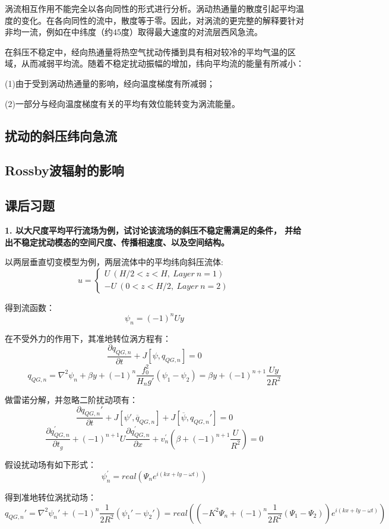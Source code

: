 \documentclass{article}
\begin{document}
涡流相互作用不能完全以各向同性的形式进行分析。涡动热通量的散度引起平均温度的变化。在各向同性的流中，散度等于零。因此，对涡流的更完整的解释要针对非均一流，例如在中纬度（约$45$度）取得最大速度的对流层西风急流。

在斜压不稳定中，经向热通量将热空气扰动传播到具有相对较冷的平均气温的区域，从而减弱平均流。随着不稳定扰动振幅的增加，纬向平均流的能量有所减小：

(1)由于受到涡动热通量的影响，经向温度梯度有所减弱；

(2)一部分与经向温度梯度有关的平均有效位能转变为涡流能量。


\subsection{扰动的斜压纬向急流}
\subsection{Rossby波辐射的影响}
\subsection{课后习题}
\textbf{1. 以大尺度平均平行流场为例，试讨论该流场的斜压不稳定需满足的条件，
并给出不稳定扰动模态的空间尺度、传播相速度、以及空间结构。}

以两层垂直切变模型为例，两层流体中的平均纬向斜压流体:
$$u=\begin{cases}
    U \ (H/2<z<H,\ Layer \ n=1) \\
    -U \ (0 < z < H/2, \ Layer \ n=2)
\end{cases}$$

得到流函数：
$$\psi_n = (-1)^{n}Uy$$

在不受外力的作用下，其准地转位涡方程有：
$$\frac{\partial q_{QG,n}}{\partial t} + J[\psi, q_{QG,n}] = 0$$
$$q_{QG,n} 
=\nabla^2\psi_n + \beta y + (-1)^{n}\frac{f_0^2}{H_ng'}(\psi_1 - \psi_2)
=\beta y + (-1)^{n+1}\frac{Uy}{2R^2}$$

做雷诺分解，并忽略二阶扰动项有：
$$\frac{\partial q_{QG,n}'}{\partial t} 
+ J[\psi', \overline{q}_{QG,n}]
+ J[\overline{\psi}, q_{QG,n}'] = 0$$
$$$$
$$\frac{\partial q^{\prime}_{QG,n}}{\partial t_g} 
+ (-1)^{n+1}U\frac{\partial q^{\prime}_{QG,n}}{\partial x} 
+ v^{\prime}_n\left(\beta + (-1)^{n+1}\frac{U}{R^2}\right)= 0$$

假设扰动场有如下形式：
$$\psi^{\prime}_n = real(\Psi_ne^{i(kx+ly-\omega t)})$$

得到准地转位涡扰动场：
$$q_{QG,n}' = \nabla^2\psi_n' + (-1)^{n}\frac{1}{2R^2}(\psi_1' - \psi_2') 
= real((-K^2\Psi_n + (-1)^{n}\frac{1}{2R^2}(\Psi_1 - \Psi_2))e^{i(kx+ly-\omega t)})  $$
\end{document}
